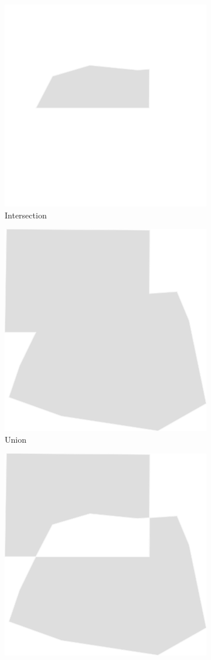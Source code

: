 \begin{figure}[h!]
\centering
\begin{subfigure}{.3\textwidth}
  \centering
  \includegraphics[width=.7\linewidth]{Abbildungen/st_intersection.png}
  \caption{Intersection}
  \label{fig:sub1}
\end{subfigure}%
\begin{subfigure}{.3\textwidth}
  \centering
  \includegraphics[width=.7\linewidth]{Abbildungen/st_union.png}
  \caption{Union}
  \label{fig:sub2}
\end{subfigure}
\begin{subfigure}{.3\textwidth}
  \centering
  \includegraphics[width=.7\linewidth]{Abbildungen/st_symdifference.png}

\end{subfigure}
\end{figure}
